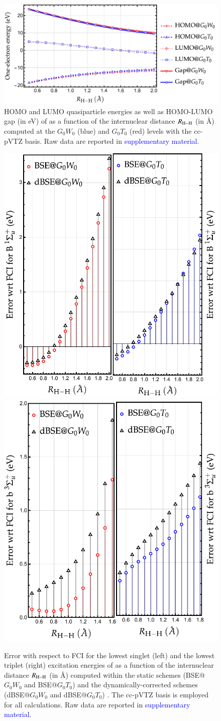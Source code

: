 \documentclass[aip,jcp,reprint,noshowkeys,superscriptaddress]{revtex4-1}
\newcommand{\SupMat}{\textcolor{blue}{supplementary material}}
\begin{document}
\begin{figure}[t]
	\includegraphics[width=\linewidth]{fig2}
	\caption{HOMO and LUMO quasiparticle energies as well as HOMO-LUMO gap (in \si{\eV}) of  as a function of the internuclear distance $R_{\ce{H-H}}$ (in \si{\angstrom}) computed at the $G_0W_0$ (blue) and $G_0T_0$ (red) levels with the cc-pVTZ basis.
	Raw data are reported in {\SupMat}.}
	\label{fig:H2_gap}
\end{figure}

\begin{figure}[t]
	\includegraphics[width=0.4\linewidth]{fig3a}
	\hspace{0.1\linewidth}
	\includegraphics[width=0.4\linewidth]{fig3b}
	\caption{
	Error with respect to FCI for the lowest singlet (left) and the lowest triplet (right) excitation energies of  as a function of the internuclear distance $R_{\ce{H-H}}$ (in \si{\angstrom}) computed within the static schemes (BSE@$G_0W_0$ and BSE@$G_0T_0$) and the dynamically-corrected schemes (dBSE@$G_0W_0$ and dBSE@$G_0T_0$) .
	The cc-pVTZ basis is employed for all calculations.
	Raw data are reported in {\SupMat}.}
	\label{fig:H2_dBSE}
\end{figure}
\end{document}
